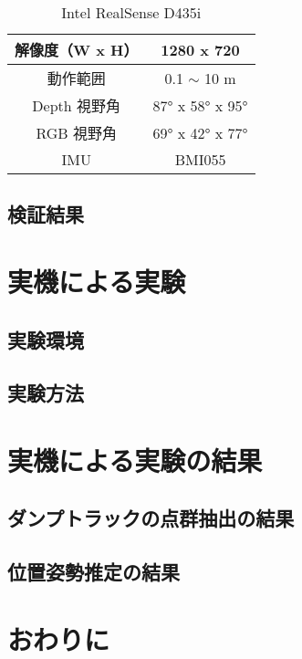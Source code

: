 \begin{table}[b]
    \begin{center}
    \caption{Intel RealSense D435i}        
\begin{tabular}{|c|c|}
\hline
解像度（W x H）      & 1280 x 720               \\ \hline
動作範囲      & 0.1 $\sim$ 10 m            \\ \hline
Depth 視野角 & 87° x 58° x 95° \\ \hline
RGB 視野角   & 69° x 42° x 77°      \\ \hline
IMU       & BMI055                   \\ \hline
    \end{tabular}
    \label{tab:intel}
    \end{center}
\end{table}

\clearpage

\subsection{検証結果}
\section{実機による実験}
\subsection{実験環境}
\subsection{実験方法}
\section{実機による実験の結果}
\subsection{ダンプトラックの点群抽出の結果}
\subsection{位置姿勢推定の結果}
\section{おわりに}
